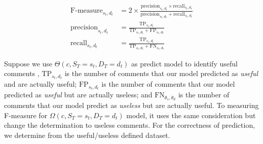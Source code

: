 \documentclass[conference]{IEEEtran}
\begin{document}
\begin{equation}
\begin{split}
\mathrm{F\text{-}measure}_{s_t,d_t} &= 2 \times \frac{\mathrm{precision}_{s_t,d_t} \times \mathrm{recall}_{s_t,d_t}}{\mathrm{precision}_{s_t,d_t} + \mathrm{recall}_{s_t,d_t}}
\\
\mathrm{precision}_{s_t,d_t}  &= \frac{\mathrm{TP}_{s_t,d_t}}{\mathrm{TP}_{s_t,d_t}+\mathrm{FP}_{s_t,d_t}}
\\
\mathrm{recall}_{s_t,d_t}  &= \frac{\mathrm{TP}_{s_t,d_t}}{\mathrm{TP}_{s_t,d_t}+\mathrm{FN}_{s_t,d_t}}
\end{split}
\label{eq:fmeasure}
\end{equation}




Suppose we use $\Theta(c,S_T=s_t,D_T=d_t)$ as predict model to identify useful comments , $\mathrm{TP}_{s_t,d_t}$ is the number of comments that our model predicted as \textit{useful} and are actually useful; $\mathrm{FP}_{s_t,d_t}$ is the number of comments that our model predicted as \textit{useful} but are actually useless; and $\mathrm{FN}_{\theta_s,\theta_d}$ is the number of comments that our model predict as \textit{useless} but are actually useful. To measuring F-measure for $\Omega(c,S_T=s_t,D_T=d_t)$ model, it uses the same consideration but change the determination to useless comments. For the correctness of prediction, we determine from the useful/useless defined dataset. 





\end{document}
